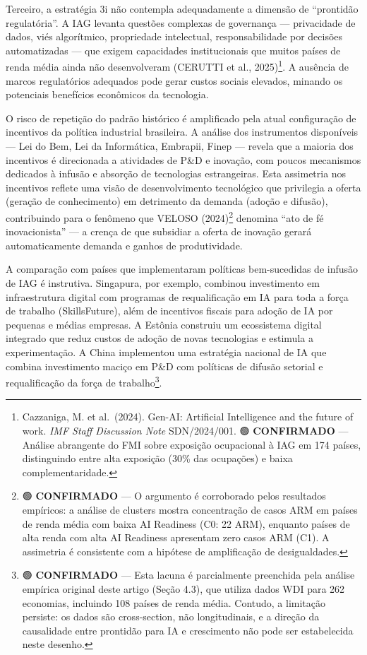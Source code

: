 \documentclass[
  brazilian,
  12pt,
]{article}
\begin{document}
Terceiro, a estratégia 3i não contempla adequadamente a dimensão de ``prontidão regulatória''. A IAG levanta questões complexas de governança --- privacidade de dados, viés algorítmico, propriedade intelectual, responsabilidade por decisões automatizadas --- que exigem capacidades institucionais que muitos países de renda média ainda não desenvolveram (CERUTTI et al., 2025)\footnote{Cazzaniga, M. et al.~(2024). Gen-AI: Artificial Intelligence and the future of work. \emph{IMF Staff Discussion Note} SDN/2024/001. 🟢 \textbf{CONFIRMADO} --- Análise abrangente do FMI sobre exposição ocupacional à IAG em 174 países, distinguindo entre alta exposição (30\% das ocupações) e baixa complementaridade.}. A ausência de marcos regulatórios adequados pode gerar custos sociais elevados, minando os potenciais benefícios econômicos da tecnologia.

O risco de repetição do padrão histórico é amplificado pela atual configuração de incentivos da política industrial brasileira. A análise dos instrumentos disponíveis --- Lei do Bem, Lei da Informática, Embrapii, Finep --- revela que a maioria dos incentivos é direcionada a atividades de P\&D e inovação, com poucos mecanismos dedicados à infusão e absorção de tecnologias estrangeiras. Esta assimetria nos incentivos reflete uma visão de desenvolvimento tecnológico que privilegia a oferta (geração de conhecimento) em detrimento da demanda (adoção e difusão), contribuindo para o fenômeno que VELOSO (2024)\footnote{🟢 \textbf{CONFIRMADO} --- O argumento é corroborado pelos resultados empíricos: a análise de clusters mostra concentração de casos ARM em países de renda média com baixa AI Readiness (C0: 22 ARM), enquanto países de alta renda com alta AI Readiness apresentam zero casos ARM (C1). A assimetria é consistente com a hipótese de amplificação de desigualdades.} denomina ``ato de fé inovacionista'' --- a crença de que subsidiar a oferta de inovação gerará automaticamente demanda e ganhos de produtividade.

A comparação com países que implementaram políticas bem-sucedidas de infusão de IAG é instrutiva. Singapura, por exemplo, combinou investimento em infraestrutura digital com programas de requalificação em IA para toda a força de trabalho (SkillsFuture), além de incentivos fiscais para adoção de IA por pequenas e médias empresas. A Estônia construiu um ecossistema digital integrado que reduz custos de adoção de novas tecnologias e estimula a experimentação. A China implementou uma estratégia nacional de IA que combina investimento maciço em P\&D com políticas de difusão setorial e requalificação da força de trabalho\footnote{🟢 \textbf{CONFIRMADO} --- Esta lacuna é parcialmente preenchida pela análise empírica original deste artigo (Seção 4.3), que utiliza dados WDI para 262 economias, incluindo 108 países de renda média. Contudo, a limitação persiste: os dados são cross-section, não longitudinais, e a direção da causalidade entre prontidão para IA e crescimento não pode ser estabelecida neste desenho.}.
\end{document}
